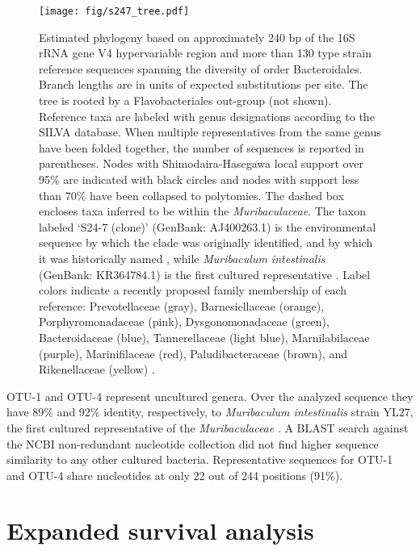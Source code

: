 \documentclass{doc/template/bmcart-nofigbox}
\newcommand{\frnlang}[1]{\textit{#1}}
\newcommand{\taxon}[1]{\frnlang{#1}}
\begin{document}
\begin{figure}[h!]
  \texttt{[image: fig/s247\_tree.pdf]}
  \caption{\label{fig:s247_tree}
  Estimated phylogeny based on approximately 240 bp of the 16S rRNA gene V4 hypervariable region
  and more than 130 type strain reference sequences spanning the diversity of
  order Bacteroidales.
  Branch lengths are in units of expected substitutions per site.
  The tree is rooted by a Flavobacteriales out-group (not shown).
  Reference taxa are labeled with genus designations according to the SILVA
  database.
  When multiple representatives from the same genus have been folded together,
  the number of sequences is reported in parentheses.
  Nodes with Shimodaira-Hasegawa local support over 95\% are indicated with black
  circles and nodes with support less than 70\% have been collapsed to polytomies.
  The dashed box encloses taxa inferred to be within the \taxon{Muribaculaceae}.
  The taxon labeled `S24-7 (clone)' (GenBank: AJ400263.1) is the environmental
  sequence by which the clade was originally identified, and by which it was
  historically named \cite{Salzman2002},
  while \taxon{Muribaculum intestinalis} (GenBank: KR364784.1) is the first
  cultured representative \cite{Lagkouvardos2016}.
  Label colors indicate a recently proposed family membership of each reference:
  Prevotellaceae (gray), Barnesiellaceae (orange), Porphyromonadaceae (pink),
  Dysgonomonadaceae (green), Bacteroidaceae (blue), Tannerellaceae (light blue),
  Marnilabilaceae (purple), Marinifilaceae (red), Paludibacteraceae (brown), and
  Rikenellaceae (yellow) \cite{Ormerod2016}.
}
\end{figure}

OTU-1 and OTU-4 represent uncultured genera.
Over the analyzed sequence they have 89\% and 92\% identity, respectively, to
\taxon{Muribaculum intestinalis} strain YL27,
the first cultured representative of the \taxon{Muribaculaceae} \cite{Lagkouvardos2016}.
A BLAST search against the NCBI non-redundant nucleotide collection
did not find higher sequence similarity to any other cultured bacteria.
Representative sequences for OTU-1 and OTU-4 share nucleotides at only 22 out
of 244 positions (91\%).

\FloatBarrier

\section{Expanded survival analysis}\label{app:expand_surv}
\end{document}

